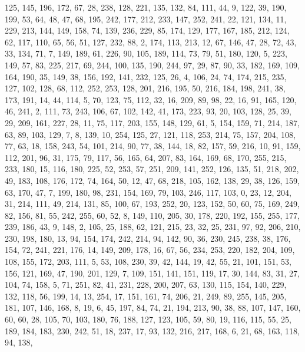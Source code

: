 \begin{DoxyCode}
       125, 145, 196, 172, 67, 28, 238, 128, 221, 135, 132, 84, 111, 44, 9, 122, 39, 190, 199, 53, 64, 48, 47, 68,
       195, 242, 177, 212, 233, 147, 252, 241, 22, 121, 134, 11, 229, 213, 144, 149, 158, 74, 139, 236, 229, 85,
       174, 129, 177, 167, 185, 212, 124, 62, 117, 110, 65, 56, 51, 127, 232, 88, 2, 174, 113, 213, 12, 67, 146, 47,
       28, 72, 43, 33, 134, 71, 7, 149, 189, 61, 226, 90, 105, 189, 114, 73, 79, 51, 180, 120, 5, 223, 149, 57,
       83, 225, 217, 69, 244, 100, 135, 190, 244, 97, 29, 87, 90, 33, 182, 169, 109, 164, 190, 35, 149, 38, 156, 192,
       141, 232, 125, 26, 4, 106, 24, 74, 174, 215, 235, 127, 102, 128, 68, 112, 252, 253, 128, 201, 216, 195, 50,
       216, 184, 198, 241, 38, 173, 191, 14, 44, 114, 5, 70, 123, 75, 112, 32, 16, 209, 89, 98, 22, 16, 91, 165,
       120, 46, 241, 2, 111, 73, 243, 106, 67, 102, 142, 41, 173, 223, 93, 20, 103, 128, 25, 39, 29, 209, 161, 227,
       28, 11, 75, 117, 203, 155, 148, 129, 61, 5, 154, 159, 71, 214, 187, 63, 89, 103, 129, 7, 8, 139, 10, 254,
       125, 27, 121, 118, 253, 214, 75, 157, 204, 108, 77, 63, 18, 158, 243, 54, 101, 214, 90, 77, 38, 144, 18, 82,
       157, 59, 216, 10, 91, 159, 112, 201, 96, 31, 175, 79, 117, 56, 165, 64, 207, 83, 164, 169, 68, 170, 255, 215,
       233, 180, 15, 116, 180, 225, 52, 253, 57, 251, 209, 141, 252, 126, 135, 51, 218, 202, 49, 183, 108, 176,
       172, 74, 164, 50, 12, 47, 68, 218, 105, 162, 138, 29, 38, 126, 159, 63, 170, 47, 7, 199, 180, 98, 231, 154,
       169, 79, 103, 246, 117, 103, 0, 23, 12, 204, 31, 214, 111, 49, 214, 131, 85, 100, 67, 193, 252, 20, 123, 152,
       50, 60, 75, 169, 249, 82, 156, 81, 55, 242, 255, 60, 52, 8, 149, 110, 205, 30, 178, 220, 192, 155, 255, 177,
       239, 186, 43, 9, 148, 2, 105, 25, 188, 62, 121, 215, 23, 32, 25, 231, 97, 92, 206, 210, 230, 198, 180, 13,
       94, 154, 174, 242, 214, 94, 142, 90, 36, 230, 245, 238, 38, 176, 154, 72, 241, 221, 176, 14, 149, 209, 178,
       16, 67, 56, 234, 253, 220, 182, 204, 109, 108, 155, 172, 203, 111, 5, 53, 108, 230, 39, 42, 144, 19, 42, 55,
       21, 101, 151, 53, 156, 121, 169, 47, 190, 201, 129, 7, 109, 151, 141, 151, 119, 17, 30, 144, 83, 31, 27,
       104, 74, 158, 5, 71, 251, 82, 41, 231, 228, 200, 207, 63, 130, 115, 154, 140, 229, 132, 118, 56, 199, 14, 13,
       254, 17, 151, 161, 74, 206, 21, 249, 89, 255, 145, 205, 181, 107, 146, 168, 8, 19, 6, 45, 197, 84, 74, 21,
       194, 213, 90, 38, 88, 107, 147, 160, 60, 60, 28, 105, 70, 103, 180, 76, 188, 127, 123, 105, 59, 80, 19, 116,
       115, 55, 25, 189, 184, 183, 230, 242, 51, 18, 237, 17, 93, 132, 216, 217, 168, 6, 21, 68, 163, 118, 94, 138,

\end{DoxyCode}
